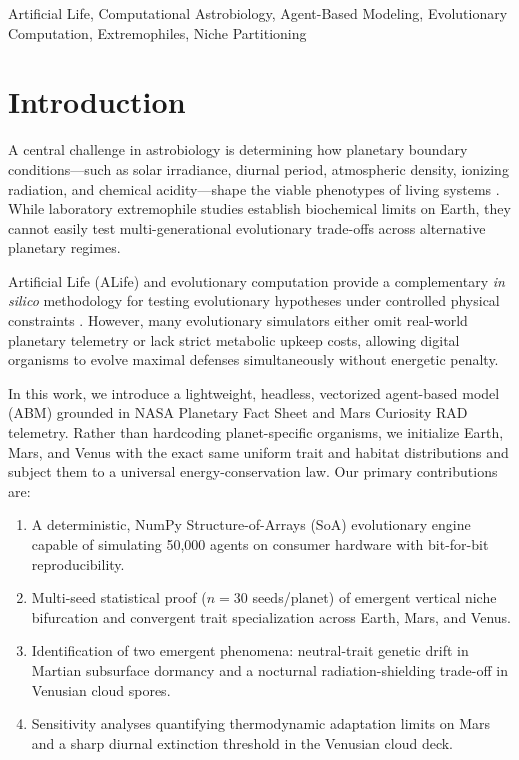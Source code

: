 \documentclass[conference]{IEEEtran}
\begin{document}
\begin{IEEEkeywords}
Artificial Life, Computational Astrobiology, Agent-Based Modeling, Evolutionary Computation, Extremophiles, Niche Partitioning
\end{IEEEkeywords}

\section{Introduction}
A central challenge in astrobiology is determining how planetary boundary conditions---such as solar irradiance, diurnal period, atmospheric density, ionizing radiation, and chemical acidity---shape the viable phenotypes of living systems \cite{seager2021venus, hassler2014mars}. While laboratory extremophile studies establish biochemical limits on Earth, they cannot easily test multi-generational evolutionary trade-offs across alternative planetary regimes.

Artificial Life (ALife) and evolutionary computation provide a complementary \textit{in silico} methodology for testing evolutionary hypotheses under controlled physical constraints \cite{adami1998introduction}. However, many evolutionary simulators either omit real-world planetary telemetry or lack strict metabolic upkeep costs, allowing digital organisms to evolve maximal defenses simultaneously without energetic penalty.

In this work, we introduce a lightweight, headless, vectorized agent-based model (ABM) grounded in NASA Planetary Fact Sheet and Mars Curiosity RAD telemetry. Rather than hardcoding planet-specific organisms, we initialize Earth, Mars, and Venus with the exact same uniform trait and habitat distributions and subject them to a universal energy-conservation law. Our primary contributions are:
\begin{enumerate}
    \item A deterministic, NumPy Structure-of-Arrays (SoA) evolutionary engine capable of simulating 50,000 agents on consumer hardware with bit-for-bit reproducibility.
    \item Multi-seed statistical proof ($n = 30$ seeds/planet) of emergent vertical niche bifurcation and convergent trait specialization across Earth, Mars, and Venus.
    \item Identification of two emergent phenomena: neutral-trait genetic drift in Martian subsurface dormancy and a nocturnal radiation-shielding trade-off in Venusian cloud spores.
    \item Sensitivity analyses quantifying thermodynamic adaptation limits on Mars and a sharp diurnal extinction threshold in the Venusian cloud deck.
\end{enumerate}
\end{document}

